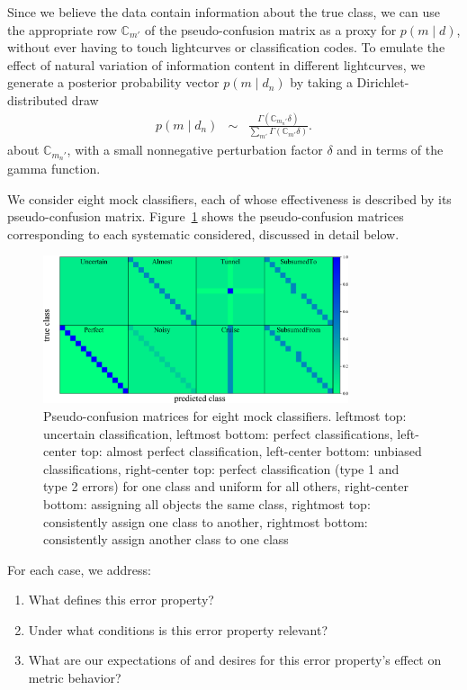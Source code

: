 Since we believe the data contain information about the true class, we can use the appropriate row $\mathbb{C}_{m'}$ of the pseudo-confusion matrix as a proxy for $p(m \mid d)$, without ever having to touch lightcurves or classification codes.
To emulate the effect of natural variation of information content in different lightcurves, we generate a posterior probability vector $p(m \mid d_{n})$ by taking a Dirichlet-distributed draw
\begin{eqnarray}
  \label{eq:cmtoprob}
  p(m \mid d_{n}) &\sim& \frac{\Gamma(\mathbb{C}_{m_{n}'} \delta)}{\sum_{m'} \Gamma(\mathbb{C}_{m'} \delta)}.
\end{eqnarray}
about $\mathbb{C}_{m_{n}'}$, with a small nonnegative perturbation factor $\delta$ and in terms of the gamma function.

We consider eight mock classifiers, each of whose effectiveness is described by its pseudo-confusion matrix.
Figure~\ref{fig:mock_cm} shows the pseudo-confusion matrices corresponding to each systematic considered, discussed in detail below.
\begin{figure}
	\begin{center}
    \includegraphics[width=0.8\textwidth]{./fig/all_sim_cm.png}
		\caption{Pseudo-confusion matrices for eight mock classifiers.
    leftmost top: uncertain classification,
    leftmost bottom: perfect classifications,
    left-center top: almost perfect classification,
    left-center bottom: unbiased classifications,
    right-center top: perfect classification (type 1 and type 2 errors) for one class and uniform for all others,
    right-center bottom: assigning all objects the same class,
    rightmost top: consistently assign one class to another,
    rightmost bottom: consistently assign another class to one class}
		\label{fig:mock_cm}
	\end{center}
\end{figure}
For each case, we address:
\begin{enumerate}
  \item What defines this error property?
  \item Under what conditions is this error property relevant?
  \item What are our expectations of and desires for this error property's effect on metric behavior?
\end{enumerate}

